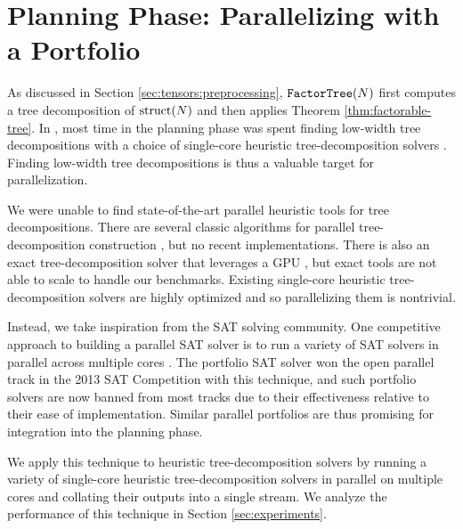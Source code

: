 \section{Planning Phase: Parallelizing with a Portfolio}
\label{sec:parallel:planning}
As discussed in Section \ref{sec:tensors:preprocessing}, $\texttt{\upshape FactorTree}(N)$ first computes a tree decomposition of $\text{struct}(N)$ and then applies Theorem \ref{thm:factorable-tree}. In \cite{DDV19}, most time in the planning phase was spent finding low-width tree decompositions with a choice of single-core heuristic tree-decomposition solvers \cite{AMW17,HS18,Tamaki17}. Finding low-width tree decompositions is thus a valuable target for parallelization.

We were unable to find state-of-the-art parallel heuristic tools for tree decompositions. There are several classic algorithms for parallel tree-decomposition construction \cite{Lagergren90,SWG13}, but no recent implementations. There is also an exact tree-decomposition solver that leverages a GPU \cite{VB17}, but exact tools are not able to scale to handle our benchmarks. Existing single-core heuristic tree-decomposition solvers are highly optimized and so parallelizing them is nontrivial.

Instead, we take inspiration from the SAT solving community. One competitive approach to building a parallel SAT solver is to run a variety of SAT solvers in parallel across multiple cores \cite{BSS15,MSSS13,XHHL08}. The portfolio SAT solver  \cite{MSSS13} won the open parallel track in the 2013 SAT Competition with this technique, and such portfolio solvers are now banned from most tracks due to their effectiveness relative to their ease of implementation. Similar parallel portfolios are thus promising for integration into the planning phase.

We apply this technique to heuristic tree-decomposition solvers by running a variety of single-core heuristic tree-decomposition solvers in parallel on multiple cores and collating their outputs into a single stream. We analyze the performance of this technique in Section \ref{sec:experiments}.

